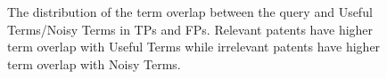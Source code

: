 \begin{figure}[t!]
\begin{centering}
 \hspace*{1.5cm}  
\par\end{centering} 

\protect\caption{The distribution of the term overlap between the query and Useful Terms/Noisy Terms in TPs and FPs. Relevant patents have higher term overlap with Useful Terms while irrelevant patents have higher term overlap with Noisy Terms.}
\label{fig:usefulnoisy}
\end{figure}
